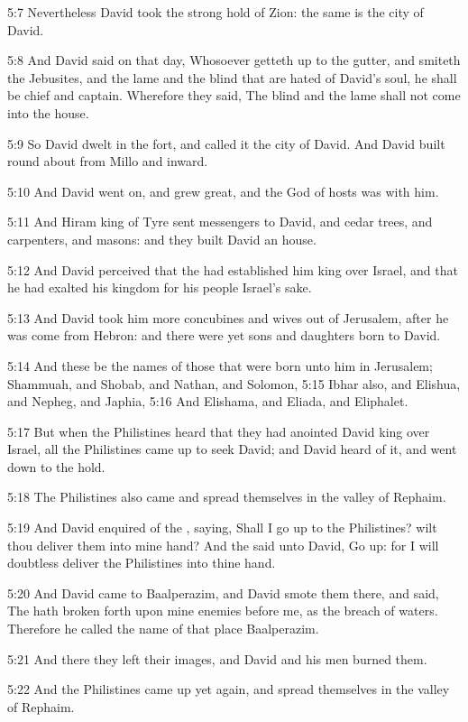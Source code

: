 5:7 Nevertheless David took the strong hold of Zion: the same is the
city of David.

5:8 And David said on that day, Whosoever getteth up to the gutter,
and smiteth the Jebusites, and the lame and the blind that are hated
of David's soul, he shall be chief and captain. Wherefore they said,
The blind and the lame shall not come into the house.

5:9 So David dwelt in the fort, and called it the city of David. And
David built round about from Millo and inward.

5:10 And David went on, and grew great, and the \LORD God of hosts was
with him.

5:11 And Hiram king of Tyre sent messengers to David, and cedar trees,
and carpenters, and masons: and they built David an house.

5:12 And David perceived that the \LORD had established him king over
Israel, and that he had exalted his kingdom for his people Israel's
sake.

5:13 And David took him more concubines and wives out of Jerusalem,
after he was come from Hebron: and there were yet sons and daughters
born to David.

5:14 And these be the names of those that were born unto him in
Jerusalem; Shammuah, and Shobab, and Nathan, and Solomon, 5:15 Ibhar
also, and Elishua, and Nepheg, and Japhia, 5:16 And Elishama, and
Eliada, and Eliphalet.

5:17 But when the Philistines heard that they had anointed David king
over Israel, all the Philistines came up to seek David; and David
heard of it, and went down to the hold.

5:18 The Philistines also came and spread themselves in the valley of
Rephaim.

5:19 And David enquired of the \LORD, saying, Shall I go up to the
Philistines? wilt thou deliver them into mine hand? And the \LORD said
unto David, Go up: for I will doubtless deliver the Philistines into
thine hand.

5:20 And David came to Baalperazim, and David smote them there, and
said, The \LORD hath broken forth upon mine enemies before me, as the
breach of waters. Therefore he called the name of that place
Baalperazim.

5:21 And there they left their images, and David and his men burned
them.

5:22 And the Philistines came up yet again, and spread themselves in
the valley of Rephaim.


